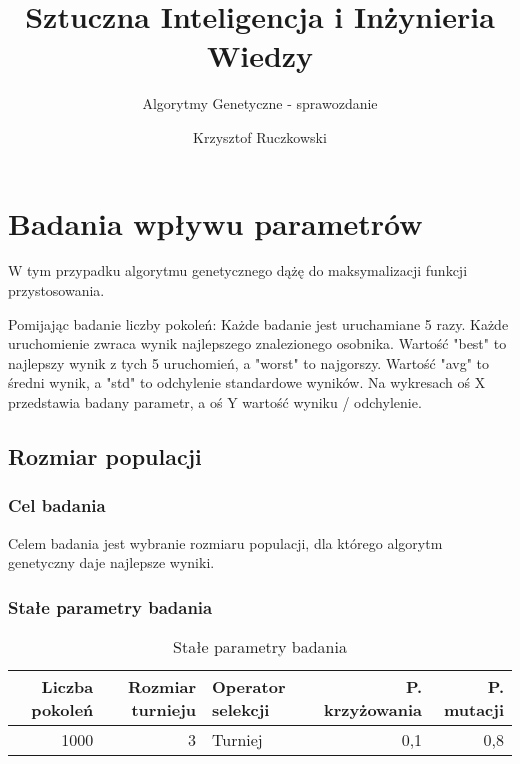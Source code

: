 \documentclass[12pt,a4paper]{article}
\author{Krzysztof Ruczkowski}
\title{Sztuczna Inteligencja i Inżynieria Wiedzy}
\subtitle{Algorytmy Genetyczne - sprawozdanie}
\begin{document}
\maketitle
\tableofcontents
\newpage

\section{Badania wpływu parametrów}
W tym przypadku algorytmu genetycznego dążę do maksymalizacji funkcji przystosowania.

Pomijając badanie liczby pokoleń:
Każde badanie jest uruchamiane 5 razy.
Każde uruchomienie zwraca wynik najlepszego znalezionego osobnika.
Wartość "best" to najlepszy wynik z tych 5 uruchomień, a "worst" to najgorszy.
Wartość "avg" to średni wynik, a "std" to odchylenie standardowe wyników.
Na wykresach oś X przedstawia badany parametr, a oś Y wartość wyniku / odchylenie.
\subsection{Rozmiar populacji}
\subsubsection{Cel badania}
Celem badania jest wybranie rozmiaru populacji, dla którego algorytm genetyczny daje najlepsze wyniki.

\subsubsection{Stałe parametry badania}
\begin{table}[htbp]
  \centering
    \begin{tabular}{rrlrr}
    \multicolumn{1}{p{3.93em}}{\textbf{Liczba pokoleń}} & \multicolumn{1}{p{4.07em}}{\textbf{Rozmiar turnieju}} & \multicolumn{1}{p{4.07em}}{\textbf{Operator selekcji}} & \multicolumn{1}{p{5.715em}}{\textbf{P. krzyżowania}} & \multicolumn{1}{p{5.355em}}{\textbf{P.  mutacji}} \\
    \midrule
    1000  & 3     & Turniej & 0,1   & 0,8 \\
    \end{tabular}%
  \label{tab:addlabel}%
  \caption{Stałe parametry badania}
\end{table}%
\end{document}
